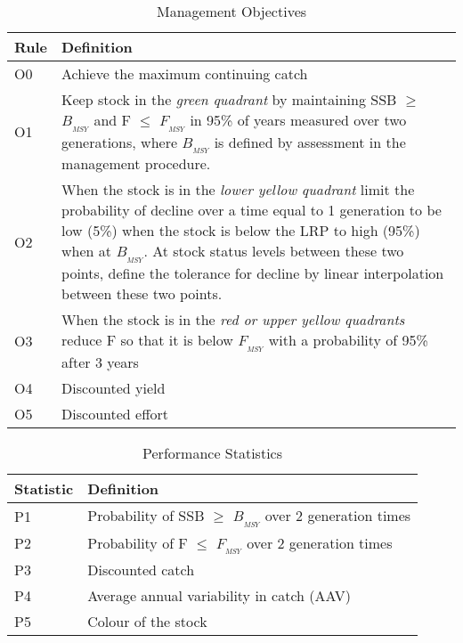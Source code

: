 \documentclass[a4paper,10pt]{article}
\begin{document}
\begin{table}[h!]
  \begin{center}
    \begin{tabular}{ l p{10cm} }
    \hline
    Rule & Definition \\
    \hline 
    O0   & Achieve the maximum continuing catch \\
    O1   & Keep stock in the \emph{green quadrant} by maintaining SSB $\geq$ $B_{_{MSY}}$ and F $\le$ $F_{_{MSY}}$ in 95\% of years 
          measured over two generations, where $B_{_{MSY}}$ is defined by assessment in the management procedure. \\
    O2   & When the stock is in the \emph{lower yellow quadrant} limit the probability of decline over a time equal to 1 generation to be low (5\%)
          when the stock is below the LRP to high (95\%) when at $B_{_{MSY}}$. At stock status levels
          between these two points, define the tolerance for decline by linear
          interpolation between these two points. \\ 
    O3   & When the stock is in the \emph{red or upper yellow quadrants} reduce F so that it is below $F_{_{MSY}}$ with a probability of 95\% after 3 years  \\ 	
    O4   & Discounted yield  \\ 	
    O5   & Discounted effort  \\ 	
     \hline
    \end{tabular}
  \end{center}
  \label{tab:hcr}
  \caption{Management Objectives}  
\end{table}

\begin{table}[h!]
  \begin{center}
    \begin{tabular}{ l p{10cm} }
    \hline 
    Statistic & Definition \\ 
    \hline 
    P1   & Probability of SSB $\geq$ $B_{_{MSY}}$ over 2 generation times \\ 
    P2   & Probability of F $\le$  $F_{_{MSY}}$ over 2 generation times \\ 
    P3   & Discounted catch\\ 
    P4   & Average annual variability in catch (AAV) \\ 
    P5   & Colour of the stock \\
    \hline 
    \end{tabular}
  \end{center}
  \label{tab:stats}
  \caption{Performance Statistics}  
\end{table}
\end{document}
